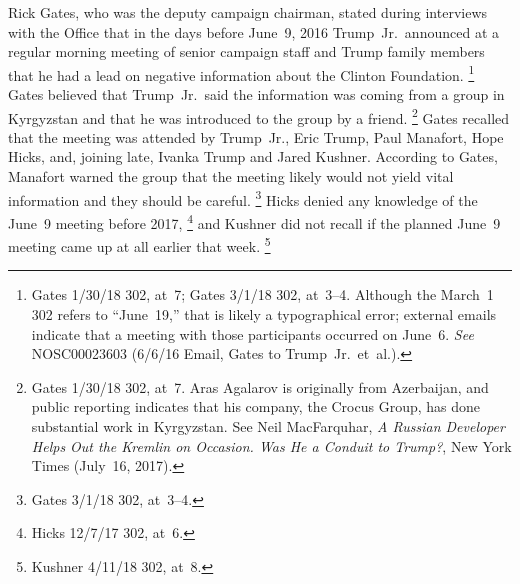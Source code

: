 Rick Gates, who was the deputy campaign chairman, stated during interviews with the Office that in the days before June~9, 2016 Trump~Jr.\ announced at a regular morning meeting of senior campaign staff and Trump family members that he had a lead on negative information about the Clinton Foundation.%
\footnote{Gates 1/30/18 302, at~7;
Gates 3/1/18 302, at~3--4.
Although the March~1 302 refers to ``June~19,'' that is likely a typographical error;
external emails indicate that a meeting with those participants occurred on June~6.
\textit{See} NOSC00023603 (6/6/16 Email, Gates to Trump~Jr.\ et~al.).}
Gates believed that Trump~Jr.\ said the information was coming from a group in Kyrgyzstan and that he was introduced to the group by a friend.%
\footnote{Gates 1/30/18 302, at~7.
Aras Agalarov is originally from Azerbaijan, and public reporting indicates that his company, the Crocus Group, has done substantial work in Kyrgyzstan.
See Neil MacFarquhar, \textit{A Russian Developer Helps Out the Kremlin on Occasion. Was He a Conduit to Trump?}, New York Times (July~16, 2017).}
Gates recalled that the meeting was attended by Trump~Jr., Eric Trump, Paul Manafort, Hope Hicks, and, joining late, Ivanka Trump and Jared Kushner.
According to Gates, Manafort warned the group that the meeting likely would not yield vital information and they should be careful.%
\footnote{Gates 3/1/18 302, at~3--4.}
Hicks denied any knowledge of the June~9 meeting before 2017,%
\footnote{Hicks 12/7/17 302, at~6.}
and Kushner did not recall if the planned June~9 meeting came up at all earlier that week.%
\footnote{Kushner 4/11/18 302, at~8.}

